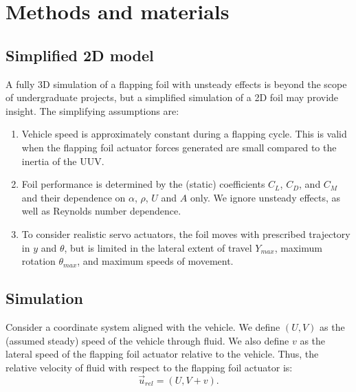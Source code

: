 \documentclass[twocolumn,10pt]{IEEEtran}
\begin{document}
\section{Methods and materials}
\subsection{Simplified 2D model}
A fully 3D simulation of a flapping foil with unsteady effects is beyond the scope of undergraduate projects, but a simplified simulation of a 2D foil may provide insight. The simplifying assumptions are:
\begin{enumerate}
\item Vehicle speed is approximately constant during a flapping cycle. This is valid when the flapping foil actuator forces generated are small compared to the inertia of the UUV. 
\item Foil performance is determined by the (static) coefficients $C_L$, $C_D$, and $C_M$ and their dependence on $\alpha$, $\rho$, $U$ and $A$ only. We ignore unsteady effects, as well as Reynolds number dependence. 
\item To consider realistic servo actuators, the foil moves with prescribed trajectory in $y$ and $\theta$, but is limited in the lateral extent of travel $Y_{max}$, maximum rotation $\theta_{max}$, and maximum speeds of movement. 
\end{enumerate}

\subsection{Simulation}
Consider a coordinate system aligned with the vehicle. We define $(U,V)$ as the (assumed steady) speed of the vehicle through fluid. We also define $v$ as the lateral speed of the flapping foil actuator relative to the vehicle. Thus, the relative velocity of fluid with respect to the flapping foil actuator is:
\begin{equation}
\vec{u}_{rel} = (U, V+v).
\end{equation}
\end{document}
